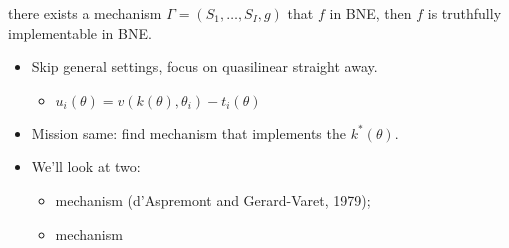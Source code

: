 \documentclass[english]{beamer}		%
\def\lyxframeend{} %
\begin{document}
\begin{theorem}
	 there exists a mechanism $\Gamma=(S_{1},\dots,S_{I},g)$ that  $f$ in BNE, 
	\alert{then} $f$ is \alert{truthfully implementable} in BNE.
\end{theorem}
\lyxframeend


\begin{itemize}
	\item Skip general settings, focus on \alert{quasilinear} straight away.
	\begin{itemize}
		\item $u_i(\theta) = v(k(\theta),\theta_i) - t_i(\theta)$
	\end{itemize}
	\item Mission same: find mechanism that implements the  $k^*(\theta)$.
	\pause
	\item We'll look at two:
	\begin{itemize}
		\item {} mechanism (d'Aspremont and Gerard-Varet, 1979);
		\item {} mechanism
	\end{itemize}
\end{itemize}
\lyxframeend

%	
%	
%
\end{document}
